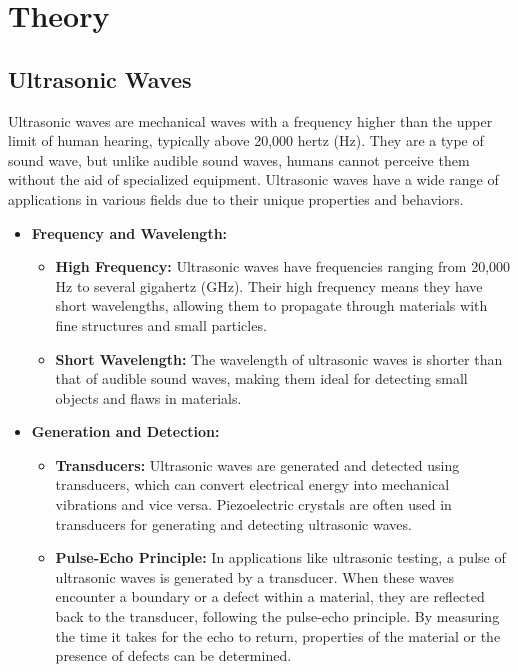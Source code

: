 \cleardoublepage%
\chapter{\label{chap:intro}Theory}%


\section{\label{sec:intro_swm_africa}Ultrasonic Waves}%
Ultrasonic waves are mechanical waves with a frequency higher than the upper limit of human hearing, typically above 20,000 hertz (Hz). They are a type of sound wave, but unlike audible sound waves, humans cannot perceive them without the aid of specialized equipment. Ultrasonic waves have a wide range of applications in various fields due to their unique properties and behaviors.
\begin{itemize}
    

\item  \textbf{Frequency and Wavelength:}
\begin{itemize}
    
\item \textbf{High Frequency:} Ultrasonic waves have frequencies ranging from 20,000 Hz to several gigahertz (GHz). Their high frequency means they have short wavelengths, allowing them to propagate through materials with fine structures and small particles.\\
\item \textbf{Short Wavelength:} The wavelength of ultrasonic waves is shorter than that of audible sound waves, making them ideal for detecting small objects and flaws in materials.

\end{itemize}
\item  \textbf{Generation and Detection:}
\begin{itemize}

\item \textbf{Transducers:} Ultrasonic waves are generated and detected using transducers, which can convert electrical energy into mechanical vibrations and vice versa. Piezoelectric crystals are often used in transducers for generating and detecting ultrasonic waves.\\
\item \textbf{Pulse-Echo Principle:} In applications like ultrasonic testing, a pulse of ultrasonic waves is generated by a transducer. When these waves encounter a boundary or a defect within a material, they are reflected back to the transducer, following the pulse-echo principle. By measuring the time it takes for the echo to return, properties of the material or the presence of defects can be determined.
\end{itemize}
\end{itemize}

